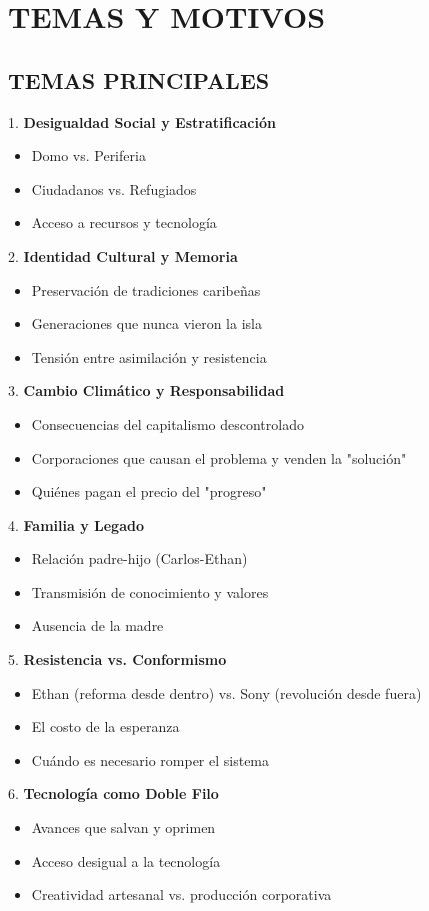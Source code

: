 \documentclass[11pt,a4paper]{report}
\begin{document}
\section{TEMAS Y MOTIVOS}

\subsection{TEMAS PRINCIPALES}

1. \textbf{Desigualdad Social y Estratificación}
\begin{itemize}
  \item Domo vs. Periferia
  \item Ciudadanos vs. Refugiados
  \item Acceso a recursos y tecnología

\end{itemize}
2. \textbf{Identidad Cultural y Memoria}
\begin{itemize}
  \item Preservación de tradiciones caribeñas
  \item Generaciones que nunca vieron la isla
  \item Tensión entre asimilación y resistencia

\end{itemize}
3. \textbf{Cambio Climático y Responsabilidad}
\begin{itemize}
  \item Consecuencias del capitalismo descontrolado
  \item Corporaciones que causan el problema y venden la "solución"
  \item Quiénes pagan el precio del "progreso"

\end{itemize}
4. \textbf{Familia y Legado}
\begin{itemize}
  \item Relación padre-hijo (Carlos-Ethan)
  \item Transmisión de conocimiento y valores
  \item Ausencia de la madre

\end{itemize}
5. \textbf{Resistencia vs. Conformismo}
\begin{itemize}
  \item Ethan (reforma desde dentro) vs. Sony (revolución desde fuera)
  \item El costo de la esperanza
  \item Cuándo es necesario romper el sistema

\end{itemize}
6. \textbf{Tecnología como Doble Filo}
\begin{itemize}
  \item Avances que salvan y oprimen
  \item Acceso desigual a la tecnología
  \item Creatividad artesanal vs. producción corporativa

\end{itemize}
\end{document}
